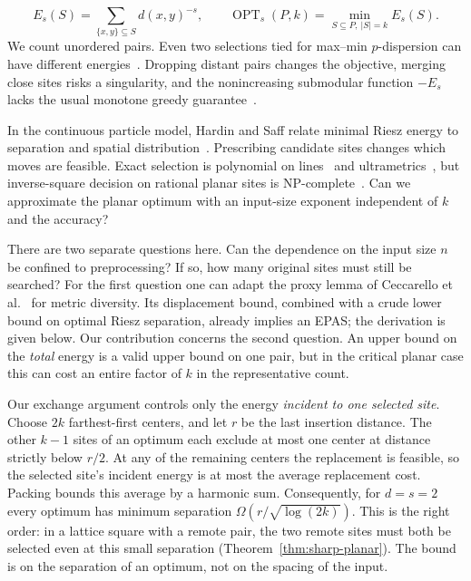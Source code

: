 \documentclass[a4paper,12pt]{article}
\newcommand{\OPT}{\operatorname{OPT}}
\numberwithin{equation}{section}
\begin{document}
\begin{equation}\label{eq:problem}
 E_s(S)=\sum_{\{x,y\}\subseteq S}d(x,y)^{-s},\qquad
 \OPT_s(P,k)=\min_{S\subseteq P,\ |S|=k} E_s(S).
\end{equation}
We count unordered pairs. Even two selections tied for max--min $p$-dispersion can have different
energies~\cite[Proposition 1]{metric2026}. Dropping distant pairs changes the objective, merging
close sites risks a singularity, and the nonincreasing submodular function $-E_s$ lacks the usual
monotone greedy guarantee~\cite{falconDiversity2025}.

In the continuous particle model, Hardin and Saff relate minimal Riesz energy to separation and
spatial distribution~\cite{hardinSaff2005,borodachov2019}. Prescribing candidate sites changes
which moves are feasible. Exact selection is polynomial on lines~\cite{line2026} and
ultrametrics~\cite{metric2026}, but inverse-square decision on rational planar sites is
NP-complete~\cite[Theorem 1.1]{plane2026}. Can we approximate the planar optimum with an
input-size exponent independent of $k$ and the accuracy?

There are two separate questions here. Can the dependence on the input size $n$ be confined to
preprocessing? If so, how many original sites must still be searched? For the first question one
can adapt the proxy lemma of Ceccarello et al.~\cite[Section 5, Lemma 5]{ceccarello2017} for
metric diversity. Its displacement bound, combined with a crude lower bound on optimal Riesz
separation, already implies an EPAS; the derivation is given below. Our contribution concerns
the second question. An upper bound on the \emph{total} energy is a valid upper bound on one
pair, but in the critical planar case this can cost an entire factor of $k$ in the
representative count.

Our exchange argument controls only the energy \emph{incident to one selected site}.
Choose $2k$ farthest-first centers, and let $r$ be the last insertion distance. The other $k-1$
sites of an optimum each exclude at most one center at distance strictly below $r/2$. At any of
the remaining centers the replacement is feasible, so the selected site's incident energy is at
most the average replacement cost. Packing bounds this average by a harmonic sum. Consequently,
for $d=s=2$ every optimum has minimum separation $\Omega(r/\sqrt{\log(2k)})$. This is the right
order: in a lattice square with a remote pair, the two remote sites must both be selected even
at this small separation (Theorem~\ref{thm:sharp-planar}). The bound is on the separation of an
optimum, not on the spacing of the input.
\end{document}
